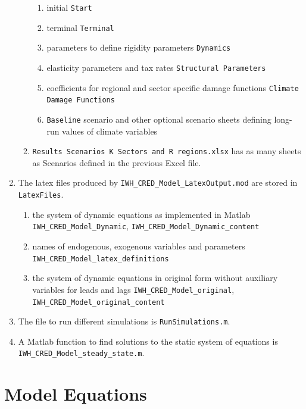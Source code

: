 \documentclass[10pt,a4paper]{article}
\begin{document}
\begin{enumerate}
\begin{enumerate}
\begin{enumerate}
\item initial {\tt Start}
\item terminal {\tt Terminal}
\item parameters to define rigidity parameters {\tt Dynamics}
\item elasticity parameters and tax rates {\tt Structural Parameters}
\item coefficients for regional and sector specific damage functions {\tt Climate Damage Functions}
\item {\tt Baseline} scenario and other optional scenario sheets defining long-run values of climate variables
\end{enumerate}
\item {\tt Results Scenarios K Sectors and R regions.xlsx} has as many sheets as Scenarios defined in the previous Excel file.
\end{enumerate}
\item The latex files produced by {\tt IWH_CRED_Model_LatexOutput.mod} are stored in {\tt LatexFiles}.
\begin{enumerate}
\item the system of dynamic equations as implemented in Matlab {\tt IWH_CRED_Model_Dynamic}, {\tt IWH_CRED_Model_Dynamic_content}
\item names of endogenous, exogenous variables and parameters {\tt IWH_CRED_Model_latex_definitions}
\item the system of dynamic equations in original form without auxiliary variables for leads and lags {\tt IWH_CRED_Model_original}, {\tt IWH_CRED_Model_original_content}
\end{enumerate}
\item The file to run different simulations is {\tt RunSimulations.m}.
\item A Matlab function to find solutions to the static system of equations is {\tt IWH_CRED_Model_steady_state.m}.
\end{enumerate}



\appendix
\section{Model Equations}
\footnotesize

\cleardoublepage

\end{document}

